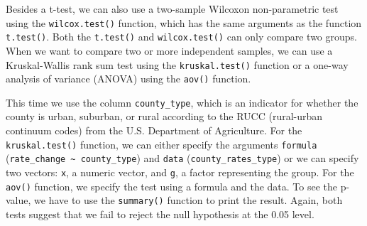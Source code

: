 \documentclass[
  letterpaper,
]{latex/krantz}
\makeatletter
\newenvironment{Shaded}{\begin{snugshade}}{\end{snugshade}}
\newcommand{\AttributeTok}[1]{\textcolor[rgb]{0.40,0.45,0.13}{#1}}
\newcommand{\CommentTok}[1]{\textcolor[rgb]{0.37,0.37,0.37}{#1}}
\newcommand{\ConstantTok}[1]{\textcolor[rgb]{0.56,0.35,0.01}{#1}}
\newcommand{\FunctionTok}[1]{\textcolor[rgb]{0.28,0.35,0.67}{#1}}
\newcommand{\NormalTok}[1]{\textcolor[rgb]{0.00,0.23,0.31}{#1}}
\newcommand{\OtherTok}[1]{\textcolor[rgb]{0.00,0.23,0.31}{#1}}
\newcommand{\SpecialCharTok}[1]{\textcolor[rgb]{0.37,0.37,0.37}{#1}}
\newcommand{\StringTok}[1]{\textcolor[rgb]{0.13,0.47,0.30}{#1}}
\newenvironment{kframe}{%
\medskip{}
\setlength{\fboxsep}{.8em}
 \def\at@end@of@kframe{}%
 \ifinner\ifhmode%
  \def\at@end@of@kframe{\end{minipage}}%
  \begin{minipage}{\columnwidth}%
 \fi\fi%
 \def\FrameCommand##1{\hskip\@totalleftmargin \hskip-\fboxsep
 \colorbox{shadecolor}{##1}\hskip-\fboxsep
     \hskip-\linewidth \hskip-\@totalleftmargin \hskip\columnwidth}%
 \MakeFramed {\advance\hsize-\width
   \@totalleftmargin\z@ \linewidth\hsize
   \@setminipage}}%
 {\par\unskip\endMakeFramed%
 \at@end@of@kframe}
\renewenvironment{Shaded}{\begin{kframe}}{\end{kframe}}
\makeatother
\begin{document}
\begin{Shaded}
\end{Shaded}

Besides a t-test, we can also use a two-sample Wilcoxon non-parametric
test using the
\texttt{wilcox.test()}
function, which has the same arguments as the function
\texttt{t.test()}. Both the \texttt{t.test()} and \texttt{wilcox.test()}
can only compare two groups. When we want to compare two or more
independent samples, we can use a Kruskal-Wallis rank sum test using the
\texttt{kruskal.test()}
function or a one-way analysis of variance (ANOVA) using the
\texttt{aov()} function.

This time we use the column \texttt{county\_type}, which is an indicator
for whether the county is urban, suburban, or rural according to the
RUCC (rural-urban continuum codes) from the U.S. Department of
Agriculture. For the \texttt{kruskal.test()} function, we can either
specify the arguments \texttt{formula}
(\texttt{rate\_change\ \textasciitilde{}\ county\_type}) and
\texttt{data} (\texttt{county\_rates\_type}) or we can specify two
vectors: \texttt{x}, a numeric vector, and \texttt{g}, a factor
representing the group. For the \texttt{aov()} function, we specify the
test using a formula and the data. To see the p-value, we have to use
the \texttt{summary()}
function to print the result. Again, both tests suggest that we fail to
reject the null hypothesis at the 0.05 level.
\end{document}
